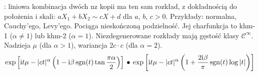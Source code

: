 : liniowa kombinacja dwóch nz kopii ma ten sam rozkład, z dokładnością do położenia i skali: $aX_1 + bX_2 \sim cX + d$ dla $a$, $b$, $c > 0$.
Przykłady: normalna, Cauchy'ego, Levy'ego.
Pociąga nieskończoną podzielność.
Jej charfunkcja to khm-1 ($\alpha \neq 1$) lub khm-2 ($\alpha = 1$).
Niezdegenerowane rozkłady mają gęstość klasy $\mathscr C^\infty$.
Nadzieja $\mu$ (dla $\alpha > 1$), wariancja $2c \cdot c$ (dla $\alpha = 2$).
\[
	\exp \left[\textrm{i}t\mu - |ct|^\alpha  \left(1 - \textrm{i} \beta \operatorname{sgn}(t) \tan \frac {\pi \alpha} 2\right) \right] \, \bullet \,
	\exp \left[\textrm{i}t\mu - |ct|^\alpha \left(1 +  \frac{2 \textrm{i} \beta}{\pi} \operatorname{sgn}(t) \log |t|\right) \right] 
\]